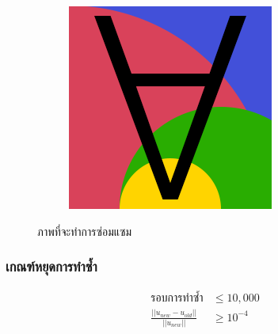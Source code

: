 \documentclass[xcolor=dvipsnames, xetex,serif]{beamer}
\numberwithin{equation}{section}
\begin{document}
\begin{frame}
\begin{figure}[H]
\begin{subfigure}{0.3\linewidth}
					\includegraphics[width=0.7\linewidth]{images/image_inpaint_synthetic/case05-toinpaint.png}
				\end{subfigure}
				\caption{ภาพที่จะทำการซ่อมแซม}
			\end{figure}
		\end{frame}
		\begin{frame}
			\frametitle{เกณฑ์หยุดการทำซ้ำ}
			\begin{align*}
				\text{รอบการทำซ้ำ} &\leq 10,000 \\[1cm]
				\frac{|| u_{new} - u_{old} ||}{|| u_{new} ||} &\geq 10^{-4}
			\end{align*}
		\end{frame}
\end{document}
